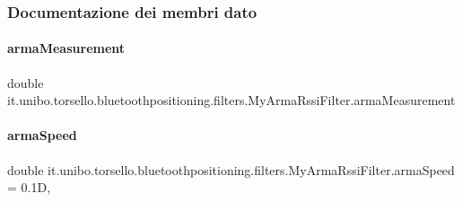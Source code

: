 \subsubsection{Documentazione dei membri dato}
\hypertarget{classit_1_1unibo_1_1torsello_1_1bluetoothpositioning_1_1filters_1_1MyArmaRssiFilter_ac386c808d409a1e6fc68801a3c2cf4b9_ac386c808d409a1e6fc68801a3c2cf4b9}{}\label{classit_1_1unibo_1_1torsello_1_1bluetoothpositioning_1_1filters_1_1MyArmaRssiFilter_ac386c808d409a1e6fc68801a3c2cf4b9_ac386c808d409a1e6fc68801a3c2cf4b9} 
\paragraph{\texorpdfstring{arma\+Measurement}{armaMeasurement}}
{\footnotesize\ttfamily double it.\+unibo.\+torsello.\+bluetoothpositioning.\+filters.\+My\+Arma\+Rssi\+Filter.\+arma\+Measurement\hspace{0.3cm}{\ttfamily [private]}}

\hypertarget{classit_1_1unibo_1_1torsello_1_1bluetoothpositioning_1_1filters_1_1MyArmaRssiFilter_a55fe96a8f80f6ec634e4f9f9e2e337f8_a55fe96a8f80f6ec634e4f9f9e2e337f8}{}\label{classit_1_1unibo_1_1torsello_1_1bluetoothpositioning_1_1filters_1_1MyArmaRssiFilter_a55fe96a8f80f6ec634e4f9f9e2e337f8_a55fe96a8f80f6ec634e4f9f9e2e337f8} 
\paragraph{\texorpdfstring{arma\+Speed}{armaSpeed}}
{\footnotesize\ttfamily double it.\+unibo.\+torsello.\+bluetoothpositioning.\+filters.\+My\+Arma\+Rssi\+Filter.\+arma\+Speed = 0.\+1D\hspace{0.3cm}{\ttfamily [static]}, {\ttfamily [private]}}

